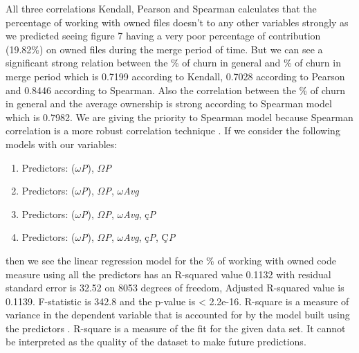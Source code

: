 \documentclass{acm_proc_article-sp}
\begin{document}
All three correlations Kendall, Pearson and Spearman calculates that the percentage of working with owned files doesn't to any other variables strongly as we predicted seeing figure 7 having a very poor percentage of contribution (19.82\%) on owned files during the merge period of time. But we can see a significant strong relation between the \% of churn in general and \% of churn in merge period which is 0.7199 according to Kendall, 0.7028 according to Pearson and 0.8446 according to Spearman. Also the correlation between the \% of churn in general and the average ownership is strong according to Spearman model which is 0.7982. We are giving the priority to Spearman model because Spearman correlation is a more robust correlation technique \cite{nagappan_defect}.
If we consider the following models with our variables:
\renewcommand{\labelenumi}{M\theenumi:}
\begin{enumerate}
\item{Predictors: ($\omega$\textit{P}), $\Omega$\textit{P}}
\item{Predictors: ($\omega$\textit{P}), $\Omega$\textit{P}, $\omega$\textit{Avg}}
\item{Predictors: ($\omega$\textit{P}), $\Omega$\textit{P}, $\omega$\textit{Avg}, \c{c}\textit{P}}
\item{Predictors: ($\omega$\textit{P}), $\Omega$\textit{P}, $\omega$\textit{Avg}, \c{c}\textit{P}, \c{C}\textit{P}}
\end{enumerate}
then we see the linear regression model for the \% of working with owned code measure using all the predictors has an R-squared value 0.1132 with residual standard error is 32.52 on 8053 degrees of freedom, Adjusted R-squared value is 0.1139. F-statistic is 342.8 and the p-value is < 2.2e-16. R-square is a measure of variance in the dependent variable that is accounted for by the model built using the predictors \cite{nagappan_defect}. R-square is a measure of the fit for the given data set. It cannot be interpreted as the quality of the dataset to make future predictions. 
\end{document}
